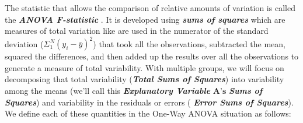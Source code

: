 \documentclass[]{book}
\theoremstyle{definition}
\theoremstyle{definition}
\theoremstyle{remark}
\begin{document}
The statistic that allows the comparison of relative amounts of
variation is called the \textbf{\emph{ANOVA F-statistic}} . It is
developed using \textbf{\emph{sums of squares}} which are measures of
total variation like are used in the numerator of the standard deviation
(\(\Sigma_1^N(y_i-\bar{y})^2\)) that took all the observations,
subtracted the mean, squared the differences, and then added up the
results over all the observations to generate a measure of total
variability. With multiple groups, we will focus on decomposing that
total variability (\textbf{\emph{Total Sums of Squares}}) into
variability among the means (we'll call this \textbf{\emph{Explanatory
Variable}} \(\mathbf{A}\textbf{'s}\) \textbf{\emph{Sums of Squares}})
and variability in the residuals or errors ( \textbf{\emph{Error Sums of
Squares}}). We define each of these quantities in the One-Way ANOVA
situation as follows:
\end{document}
